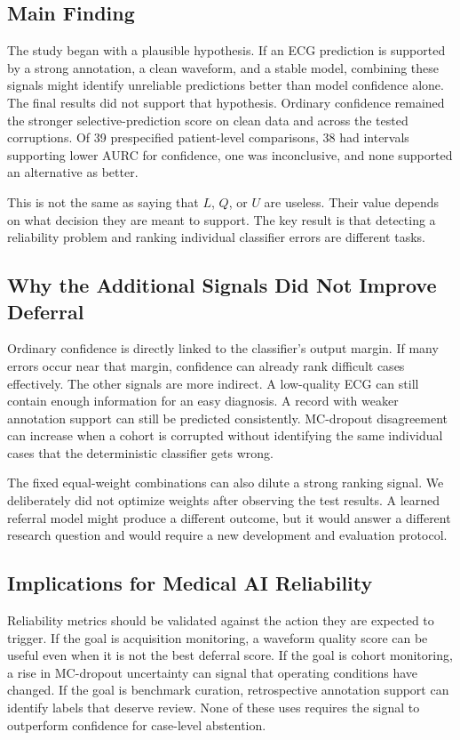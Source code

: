 \documentclass[journal]{IEEEtran}
\begin{document}
\subsection{Main Finding}
The study began with a plausible hypothesis. If an ECG prediction is supported by a strong annotation, a clean waveform, and a stable model, combining these signals might identify unreliable predictions better than model confidence alone. The final results did not support that hypothesis. Ordinary confidence remained the stronger selective-prediction score on clean data and across the tested corruptions. Of 39 prespecified patient-level comparisons, 38 had intervals supporting lower AURC for confidence, one was inconclusive, and none supported an alternative as better.

This is not the same as saying that $L$, $Q$, or $U$ are useless. Their value depends on what decision they are meant to support. The key result is that detecting a reliability problem and ranking individual classifier errors are different tasks.

\subsection{Why the Additional Signals Did Not Improve Deferral}
Ordinary confidence is directly linked to the classifier's output margin. If many errors occur near that margin, confidence can already rank difficult cases effectively. The other signals are more indirect. A low-quality ECG can still contain enough information for an easy diagnosis. A record with weaker annotation support can still be predicted consistently. MC-dropout disagreement can increase when a cohort is corrupted without identifying the same individual cases that the deterministic classifier gets wrong.

The fixed equal-weight combinations can also dilute a strong ranking signal. We deliberately did not optimize weights after observing the test results. A learned referral model might produce a different outcome, but it would answer a different research question and would require a new development and evaluation protocol.

\subsection{Implications for Medical AI Reliability}
Reliability metrics should be validated against the action they are expected to trigger. If the goal is acquisition monitoring, a waveform quality score can be useful even when it is not the best deferral score. If the goal is cohort monitoring, a rise in MC-dropout uncertainty can signal that operating conditions have changed. If the goal is benchmark curation, retrospective annotation support can identify labels that deserve review. None of these uses requires the signal to outperform confidence for case-level abstention.
\end{document}
